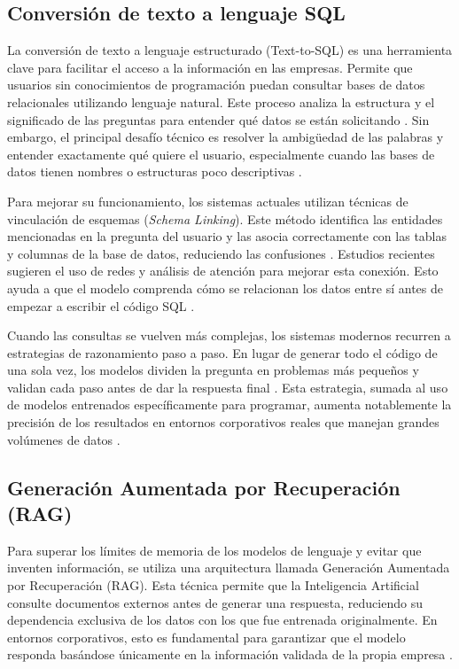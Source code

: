 \subsection{Conversión de texto a lenguaje SQL}

La conversión de texto a lenguaje estructurado (Text-to-SQL) es una herramienta
clave para facilitar el acceso a la información en las empresas. Permite que
usuarios sin conocimientos de programación puedan consultar bases de datos
relacionales utilizando lenguaje natural. Este proceso analiza la estructura y
el significado de las preguntas para entender qué datos se están solicitando
\citep{luo2024nl2sql}. Sin embargo, el principal desafío técnico es resolver la
ambigüedad de las palabras y entender exactamente qué quiere el usuario,
especialmente cuando las bases de datos tienen nombres o estructuras poco
descriptivas \citep{srivastava2026comparative}.

Para mejorar su funcionamiento, los sistemas actuales utilizan técnicas de
vinculación de esquemas (\textit{Schema Linking}). Este método identifica las
entidades mencionadas en la pregunta del usuario y las asocia correctamente con
las tablas y columnas de la base de datos, reduciendo las confusiones
\citep{qin2024gensql}. Estudios recientes sugieren el uso de redes y análisis
de atención para mejorar esta conexión. Esto ayuda a que el modelo comprenda
cómo se relacionan los datos entre sí antes de empezar a escribir el código SQL
\citep{gladkykh2025datrics}.

Cuando las consultas se vuelven más complejas, los sistemas modernos recurren a
estrategias de razonamiento paso a paso. En lugar de generar todo el código de
una sola vez, los modelos dividen la pregunta en problemas más pequeños y
validan cada paso antes de dar la respuesta final \citep{shuai2025deepvis}.
Esta estrategia, sumada al uso de modelos entrenados específicamente para
programar, aumenta notablemente la precisión de los resultados en entornos
corporativos reales que manejan grandes volúmenes de datos
\citep{lei2024spider}.

\subsection{Generación Aumentada por Recuperación (RAG)}

Para superar los límites de memoria de los modelos de lenguaje y evitar que
inventen información, se utiliza una arquitectura llamada Generación Aumentada
por Recuperación (RAG). Esta técnica permite que la Inteligencia Artificial
consulte documentos externos antes de generar una respuesta, reduciendo su
dependencia exclusiva de los datos con los que fue entrenada originalmente. En
entornos corporativos, esto es fundamental para garantizar que el modelo
responda basándose únicamente en la información validada de la propia empresa
\citep{arguello2025rag}.


